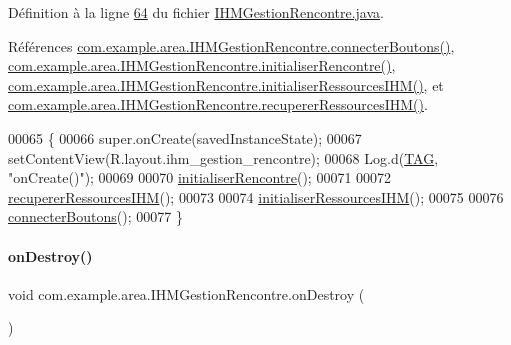 Définition à la ligne \hyperlink{_i_h_m_gestion_rencontre_8java_source_l00064}{64} du fichier \hyperlink{_i_h_m_gestion_rencontre_8java_source}{I\+H\+M\+Gestion\+Rencontre.\+java}.



Références \hyperlink{_i_h_m_gestion_rencontre_8java_source_l00158}{com.\+example.\+area.\+I\+H\+M\+Gestion\+Rencontre.\+connecter\+Boutons()}, \hyperlink{_i_h_m_gestion_rencontre_8java_source_l00199}{com.\+example.\+area.\+I\+H\+M\+Gestion\+Rencontre.\+initialiser\+Rencontre()}, \hyperlink{_i_h_m_gestion_rencontre_8java_source_l00142}{com.\+example.\+area.\+I\+H\+M\+Gestion\+Rencontre.\+initialiser\+Ressources\+I\+H\+M()}, et \hyperlink{_i_h_m_gestion_rencontre_8java_source_l00132}{com.\+example.\+area.\+I\+H\+M\+Gestion\+Rencontre.\+recuperer\+Ressources\+I\+H\+M()}.


\begin{DoxyCode}
00065     \{
00066         super.onCreate(savedInstanceState);
00067         setContentView(R.layout.ihm\_gestion\_rencontre);
00068         Log.d(\hyperlink{classcom_1_1example_1_1area_1_1_i_h_m_gestion_rencontre_a0ac4d9152d48619cd697c8c69166219f}{TAG}, \textcolor{stringliteral}{"onCreate()"});
00069 
00070         \hyperlink{classcom_1_1example_1_1area_1_1_i_h_m_gestion_rencontre_aedaadbb550aab497aac0501ced04a3eb}{initialiserRencontre}();
00071 
00072         \hyperlink{classcom_1_1example_1_1area_1_1_i_h_m_gestion_rencontre_ac3d024fe8637e7cc4469a88a7ab81b53}{recupererRessourcesIHM}();
00073 
00074         \hyperlink{classcom_1_1example_1_1area_1_1_i_h_m_gestion_rencontre_a18b1c1a04b6070a8d90aa135ad1212b7}{initialiserRessourcesIHM}();
00075 
00076         \hyperlink{classcom_1_1example_1_1area_1_1_i_h_m_gestion_rencontre_a3d4decb257b09dafa98f4a6accc8c15d}{connecterBoutons}();
00077     \}
\end{DoxyCode}
\mbox{\label{classcom_1_1example_1_1area_1_1_i_h_m_gestion_rencontre_a0cee3ae4aa9559d72f43aaa62f4ebe75}} 
\paragraph{\texorpdfstring{on\+Destroy()}{onDestroy()}}
{\footnotesize\ttfamily void com.\+example.\+area.\+I\+H\+M\+Gestion\+Rencontre.\+on\+Destroy (\begin{DoxyParamCaption}{ }\end{DoxyParamCaption})\hspace{0.3cm}{\ttfamily [protected]}}




